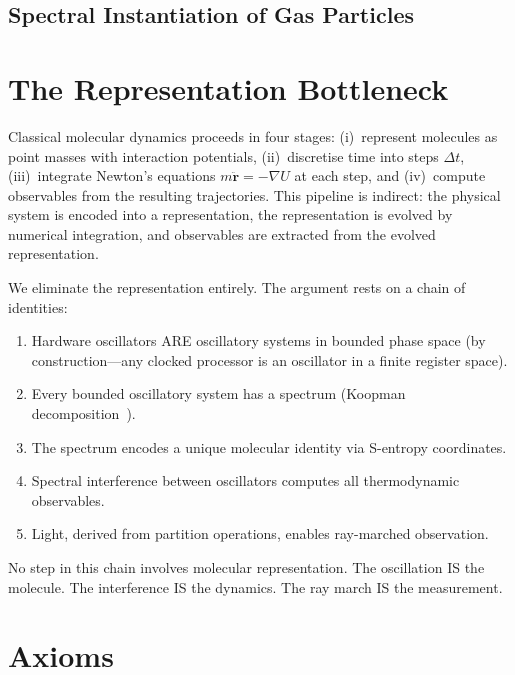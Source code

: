 
\subsection{Spectral Instantiation of Gas Particles}
\label{part:instantiation}

\section{The Representation Bottleneck}
\label{sec:bottleneck}

Classical molecular dynamics proceeds in four stages: (i)~represent molecules as point masses with interaction potentials, (ii)~discretise time into steps $\Delta t$, (iii)~integrate Newton's equations $m\ddot{\mathbf{r}} = -\nabla U$ at each step, and (iv)~compute observables from the resulting trajectories. This pipeline is indirect: the physical system is encoded into a representation, the representation is evolved by numerical integration, and observables are extracted from the evolved representation.

We eliminate the representation entirely. The argument rests on a chain of identities:
\begin{enumerate}
    \item Hardware oscillators ARE oscillatory systems in bounded phase space (by construction---any clocked processor is an oscillator in a finite register space).
    \item Every bounded oscillatory system has a spectrum (Koopman decomposition~\cite{koopman1931}).
    \item The spectrum encodes a unique molecular identity via S-entropy coordinates.
    \item Spectral interference between oscillators computes all thermodynamic observables.
    \item Light, derived from partition operations, enables ray-marched observation.
\end{enumerate}

No step in this chain involves molecular representation. The oscillation IS the molecule. The interference IS the dynamics. The ray march IS the measurement.

\section{Axioms}
\label{sec:axioms}

